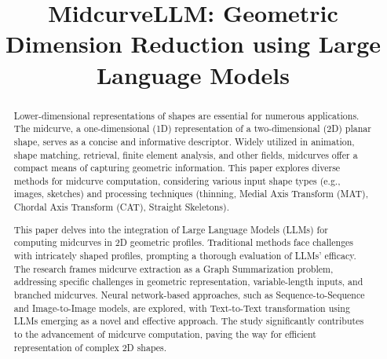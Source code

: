 \documentclass[conference]{IEEEtran}
\begin{document}

\title{MidcurveLLM: Geometric Dimension Reduction using Large Language Models}

\author{
}

\maketitle

\begin{abstract}
Lower-dimensional representations of shapes are essential for numerous applications. The midcurve, a one-dimensional (1D) representation of a two-dimensional (2D) planar shape, serves as a concise and informative descriptor. Widely utilized in animation, shape matching, retrieval, finite element analysis, and other fields, midcurves offer a compact means of capturing geometric information. This paper explores diverse methods for midcurve computation, considering various input shape types (e.g., images, sketches) and processing techniques (thinning, Medial Axis Transform (MAT), Chordal Axis Transform (CAT), Straight Skeletons).

This paper delves into the integration of Large Language Models (LLMs) for computing midcurves in 2D geometric profiles. Traditional methods face challenges with intricately shaped profiles, prompting a thorough evaluation of LLMs' efficacy. The research frames midcurve extraction as a Graph Summarization problem, addressing specific challenges in geometric representation, variable-length inputs, and branched midcurves. Neural network-based approaches, such as Sequence-to-Sequence and Image-to-Image models, are explored, with Text-to-Text transformation using LLMs emerging as a novel and effective approach. The study significantly contributes to the advancement of midcurve computation, paving the way for efficient representation of complex 2D shapes. 
\end{abstract}



\end{document}
